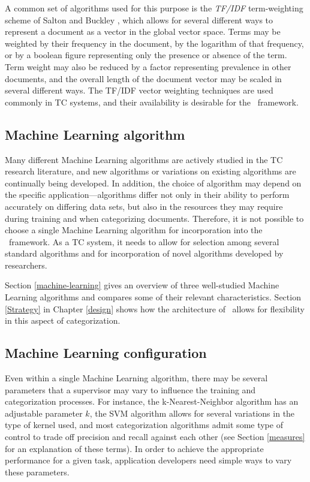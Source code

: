 A common set of algorithms used for this purpose is the \emph{TF/IDF}
term-weighting scheme of Salton and Buckley \cite{salton:88}, which
allows for several different ways to represent a document as a vector
in the global vector space.  Terms may be weighted by their frequency
in the document, by the logarithm of that frequency, or by a boolean
figure representing only the presence or absence of the term.  Term
weight may also be reduced by a factor representing prevalence in
other documents, and the overall length of the document vector may be
scaled in several different ways.  The TF/IDF vector weighting
techniques are used commonly in TC systems, and their availability is
desirable for the \aicat\ framework.

\subsection{Machine Learning algorithm}

Many different Machine Learning algorithms are actively studied in the
TC research literature, and new algorithms or variations on existing
algorithms are continually being developed.  In addition, the choice
of algorithm may depend on the specific application---algorithms
differ not only in their ability to perform accurately on differing
data sets, but also in the resources they may require during training
and when categorizing documents.  Therefore, it is not possible to
choose a single Machine Learning algorithm for incorporation into the
\aicat\ framework.  As a TC system, it needs to allow for selection
among several standard algorithms and for incorporation of novel
algorithms developed by researchers.

Section \ref{machine-learning} gives an overview of three well-studied
Machine Learning algorithms and compares some of their relevant
characteristics.  Section \ref{Strategy} in Chapter \ref{design} shows
how the architecture of \aicat\ allows for flexibility in this aspect
of categorization.

\subsection{Machine Learning configuration}
\label{ml-config}

Even within a single Machine Learning algorithm, there may be several
parameters that a supervisor may vary to influence the training and
categorization processes.  For instance, the k-Nearest-Neighbor
algorithm has an adjustable parameter $k$, the SVM algorithm allows
for several variations in the type of kernel used, and most
categorization algorithms admit some type of control to trade off
precision and recall against each other (see Section \ref{measures}
for an explanation of these terms).  In order to achieve the
appropriate performance for a given task, application developers need
simple ways to vary these parameters.

